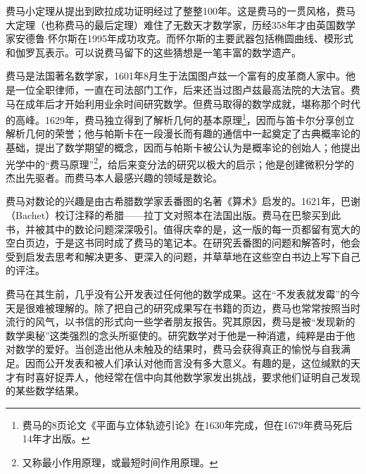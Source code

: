 \documentclass[b5paper]{ctexart}
\begin{document}
费马小定理从提出到欧拉成功证明经过了整整100年。这是费马的一贯风格，费马大定理（也称费马的最后定理）难住了无数天才数学家，历经358年才由英国数学家安德鲁$\cdot$怀尔斯在1995年成功攻克。而怀尔斯的主要武器包括椭圆曲线、模形式和伽罗瓦表示\cite{HanXueTao2009}。可以说费马留下的这些猜想是一笔丰富的数学遗产。

\vspace{5mm}

费马是法国著名数学家，1601年8月生于法国图卢兹一个富有的皮革商人家中。他是一位全职律师，一直在司法部门工作，后来还当过图卢兹最高法院的大法官。费马在成年后才开始利用业余时间研究数学。但费马取得的数学成就，堪称那个时代的高峰。1629年，费马独立得到了解析几何的基本原理\footnote{费马的8页论文《平面与立体轨迹引论》在1630年完成，但在1679年费马死后14年才出版。}，因而与笛卡尔分享创立解析几何的荣誉；他与帕斯卡在一段漫长而有趣的通信中一起奠定了古典概率论的基础，提出了数学期望的概念，因而与帕斯卡被公认为是概率论的创始人；他提出光学中的“费马原理”\footnote{又称最小作用原理，或最短时间作用原理。}，给后来变分法的研究以极大的启示；他是创建微积分学的杰出先驱者。而费马本人最感兴趣的领域是数论。

费马对数论的兴趣是由古希腊数学家丢番图的名著《算术》启发的。1621年，巴谢（Bachet）校订注释的希腊——拉丁文对照本在法国出版。费马在巴黎买到此书，并被其中的数论问题深深吸引。值得庆幸的是，这一版的每一页都留有宽大的空白页边，于是这书同时成了费马的笔记本。在研究丢番图的问题和解答时，他会受到启发去思考和解决更多、更深入的问题，并草草地在这些空白书边上写下自己的评注。

费马在其生前，几乎没有公开发表过任何他的数学成果。这在“不发表就发霉”的今天是很难被理解的。除了把自己的研究成果写在书籍的页边，费马也常常按照当时流行的风气，以书信的形式向一些学者朋友报告。究其原因，费马是被“发现新的数学奥秘”这类强烈的念头所驱使的。研究数学对于他是一种消遣，纯粹是由于他对数学的爱好。当创造出他从未触及的结果时，费马会获得真正的愉悦与自我满足。因而公开发表和被人们承认对他而言没有多大意义\cite{HanXueTao2009}。有趣的是，这位缄默的天才有时喜好捉弄人，他经常在信中向其他数学家发出挑战，要求他们证明自己发现的某些数学结果。
\end{document}
